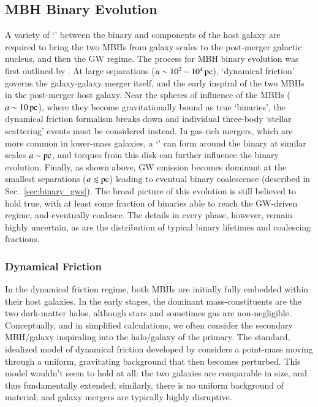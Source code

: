 \documentclass[onecolumn,authoryear]{els-mrw}
\begin{document}
\subsection{MBH Binary Evolution}\label{sec:binary_evolution}


A variety of `' between the binary and components of the host galaxy are required to bring the two MBHs from galaxy scales to the post-merger galactic nucleus, and then the GW regime.  The process for MBH binary evolution was first outlined by \citet{Begelman+1980}.  At large separations ($a \sim 10^2 - 10^4 \, \mathrm{pc}$), `dynamical friction' governs the galaxy-galaxy merger itself, and the early inspiral of the two MBHs in the post-merger host galaxy.  Near the spheres of influence of the MBHs ($a \sim 10 \, \mathrm{pc}$), where they become gravitationally bound as true `binaries', the dynamical friction formalism breaks down and individual three-body `stellar scattering' events must be considered instead.  In gas-rich mergers, which are more common in lower-mass galaxies, a `' can form around the binary at similar scales $a \sim \mathrm{pc}$, and torques from this disk can further influence the binary evolution.  Finally, as shown above, GW emission becomes dominant at the smallest separations ($a \lesssim \mathrm{pc}$) leading to eventual binary coalescence (described in Sec.~\ref{sec:binary_gws}).  The broad picture of this evolution is still believed to hold true, with at least some fraction of binaries able to reach the GW-driven regime, and eventually coalesce.  The details in every phase, however, remain highly uncertain, as are the distribution of typical binary lifetimes and coalescing fractions.

\subsubsection{Dynamical Friction}

In the dynamical friction regime, both MBHs are initially fully embedded within their host galaxies.  In the early stages, the dominant mass-constituents are the two dark-matter halos, although stars and sometimes gas are non-negligible.  Conceptually, and in simplified calculations, we often consider the secondary MBH/galaxy inspiraling into the halo/galaxy of the primary.  The standard, idealized model of dynamical friction developed by  \citet{Chandrasekhar-1943} considers a point-mass moving through a uniform, gravitating background that then becomes perturbed.  This model wouldn't seem to hold at all: the two galaxies are comparable in size, and thus fundamentally extended; similarly, there is no uniform background of material; and galaxy mergers are typically highly disruptive.
\end{document}
